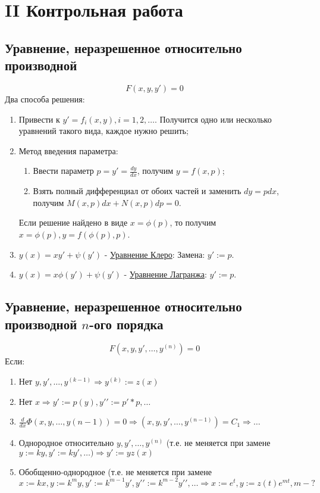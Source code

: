 \documentclass[a5paper,10pt]{article}
\begin{document}
		\newpage

	\section{II Контрольная работа}
		\subsection{Уравнение, неразрешенное относительно производной}
			$$ F(x,y,y\prime) = 0 $$
			Два способа решения:
			\begin{enumerate}
				\item Привести к $ y\prime = f_i(x,y), i=1,2,\ldots $. Получится одно или несколько уравнений такого вида, каждое нужно решить;
				
				\item Метод введения параметра:
					\begin{enumerate}
						\item Ввести параметр $ p = y\prime = \frac{dy}{dx} $, получим $ y = f(x,p) $;
						\item Взять полный дифференциал от обоих частей и заменить $ dy = pdx $, получим $ M(x,p)dx+N(x,p)dp=0 $.
					\end{enumerate}
				Если решение найдено в виде $ x=\phi(p) $, то получим $ x=\phi(p), y=f(\phi(p),p) $.
				\item $ y(x) = xy\prime+\psi(y\prime) $ - \underline{Уравнение Клеро}: Замена: $ y\prime:=p $.
				\item $ y(x) = x\phi(y\prime)+\psi(y\prime) $ - \underline{Уравнение Лагранжа}: $ y\prime:=p $.
			\end{enumerate}

		\subsection{Уравнение, неразрешенное относительно производной $n$-ого порядка}
			$$ F(x,y,y\prime,\ldots,y^{(n)}) = 0 $$
			Если:
			\begin{enumerate}
				\item Нет $ y,y\prime,\ldots,y^{(k-1)} \Rightarrow y^{(k)} := z(x) $
				
				\item Нет $ x \Rightarrow y\prime:=p(y), y\prime\prime:=p\prime*p, \ldots $
				
				\item $ \frac{d}{dx}\Phi(x, y, \ldots, y(n-1))=0 \Rightarrow (x, y, y\prime, \ldots, y^{(n-1)}) = C_1 \Rightarrow \ldots $
				
				\item Однородное относительно $ y,y\prime,\ldots,y^{(n)} $ (т.е. не меняется при замене $ y := ky, y\prime:=ky\prime, \ldots) \Rightarrow y\prime:=yz(x) $
				
				\item Обобщенно-однородное (т.е. не меняется при замене $ x:=kx, y:=k^m y, y\prime:=k^{m-1}y\prime, y\prime\prime:=k^{m-2}y\prime\prime, \ldots\Rightarrow x:=e^t, y:=z(t)e^{mt}, m - ? $
			\end{enumerate}
\end{document}
